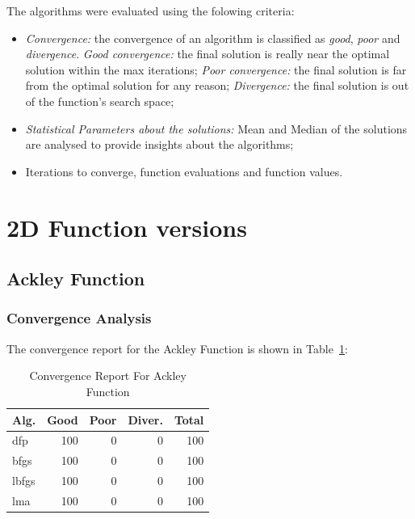 \documentclass[conference]{IEEEtran}
\begin{document}
The algorithms were evaluated using the folowing criteria:

\begin{itemize}
	\item \textit{Convergence: } the convergence of an algorithm is classified as \textit{good}, \textit{poor} and \textit{divergence}.
	\subitem \textit{Good convergence: } the final solution is really near the optimal solution within the max iterations;
	\subitem \textit{Poor convergence: } the final solution is far from the optimal solution for any reason;
	\subitem \textit{Divergence: }  the final solution is out of the function's search space;
	\item \textit{Statistical Parameters about the solutions:} Mean and Median of the solutions are analysed to provide insights about the algorithms;
	\item Iterations to converge, function evaluations and function values.
\end{itemize}
\section{2D Function versions}
\label{functions2D}

\subsection{Ackley Function}
\label{ackley2D}

\subsubsection{Convergence Analysis}
\label{convergenceackley2D}


The convergence report for the Ackley Function is shown in Table~\ref{convergence:ackley}:

\begin{table}[H]
\centering
\caption{Convergence Report For Ackley Function}
\label{convergence:ackley}
\begin{tabular}{lrrrr}
\toprule
 Alg. &  Good &  Poor &  Diver. &  Total \\
\midrule
  dfp &   100 &     0 &       0 &    100 \\
 bfgs &   100 &     0 &       0 &    100 \\
lbfgs &   100 &     0 &       0 &    100 \\
  lma &   100 &     0 &       0 &    100 \\
\bottomrule
\end{tabular}
\end{table}
\end{document}
